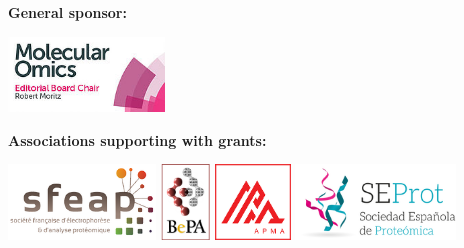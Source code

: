 \vspace*{1.5cm}
\noindent\textbf{General sponsor:}
\begin{center}
  \includegraphics[height=2cm]{graphics/Molecular-Omics_logo}
\end{center}
\vspace*{1.5cm}
\noindent\textbf{Associations supporting with grants:}
\begin{center}
  \includegraphics[height=2cm]{graphics/logo_sfeap}\hspace*{2cm}
  \includegraphics[height=2cm]{graphics/BePA_Logo}\hspace*{2cm}
  \includegraphics[height=2cm]{graphics/apma_red-white_box_logo_1k}\hspace*{2cm}
  \includegraphics[height=2cm]{graphics/LOGO_GANADOR_SEPROT_2016}
\end{center}
